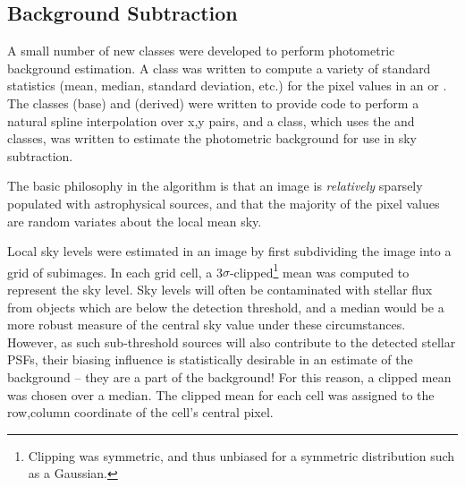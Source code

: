 
\subsection{Background Subtraction}


A small number of new classes were developed to perform photometric
background estimation.  A  class was written to compute a
variety of standard statistics (mean, median, standard deviation,
etc.) for the pixel values in an  or .  The classes
 (base) and  (derived) were written to
provide code to perform a natural spline interpolation over x,y pairs,
and a  class, which uses the  and 
classes, was written to estimate the photometric background for use in
sky subtraction.


The basic philosophy in the algorithm is that an image is {\itshape
relatively} sparsely populated with astrophysical sources, and that the
majority of the pixel values are random variates about the local mean
sky.


Local sky levels were estimated in an image by first subdividing the
image into a grid of subimages.  In each grid cell, a
3$\sigma$-clipped\footnote{Clipping was symmetric, and thus unbiased
for a symmetric distribution such as a Gaussian.} mean was computed to
represent the sky level.  Sky levels will often be contaminated with
stellar flux from objects which are below the detection threshold, and
a median would be a more robust measure of the central sky value under
these circumstances.  However, as such sub-threshold sources will also
contribute to the detected stellar PSFs, their biasing influence is
statistically desirable in an estimate of the background -- they are a
part of the background!  For this reason, a clipped mean was chosen
over a median.  The clipped mean for each cell was assigned to the
row,column coordinate of the cell's central pixel. 


